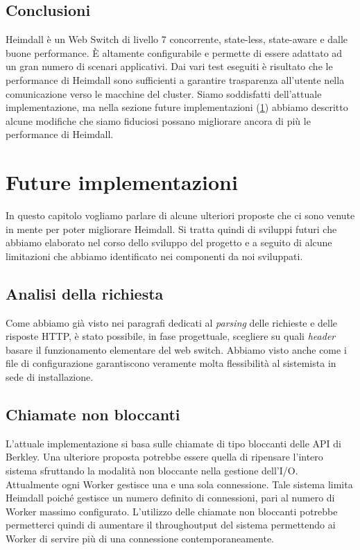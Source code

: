 \documentclass[italian]{tktltiki2}
\begin{document}
\subsection{Conclusioni}
Heimdall è un Web Switch di livello 7 concorrente, state-less, state-aware e dalle buone performance. È altamente configurabile e permette di essere adattato ad un gran numero di scenari applicativi. Dai vari test eseguiti è risultato che le performance di Heimdall sono sufficienti a garantire trasparenza all'utente nella comunicazione verso le macchine del cluster. Siamo soddisfatti dell'attuale implementazione, ma nella sezione future implementazioni (\ref{sec:future_decoded}) abbiamo descritto alcune modifiche che siamo fiduciosi possano migliorare ancora di più le performance di Heimdall.
\newpage
\section{Future implementazioni}
\label{sec:future_decoded}
In questo capitolo vogliamo parlare di alcune ulteriori proposte che ci sono venute in mente per poter migliorare Heimdall. Si tratta quindi di sviluppi futuri che abbiamo elaborato nel corso dello sviluppo del progetto e a seguito di alcune limitazioni che abbiamo identificato nei componenti da noi sviluppati.
\subsection{Analisi della richiesta}
Come abbiamo già visto nei paragrafi dedicati al \emph{parsing} delle richieste e delle risposte HTTP, è stato possibile, in fase progettuale, scegliere su quali \emph{header} basare il funzionamento elementare del web switch. Abbiamo visto anche come i file di configurazione garantiscono veramente molta flessibilità al sistemista in sede di installazione.

\subsection{Chiamate non bloccanti}
L'attuale implementazione si basa sulle chiamate di tipo bloccanti delle API di Berkley. Una ulteriore proposta potrebbe essere quella di ripensare l'intero sistema sfruttando la modalità non bloccante nella gestione dell'I/O.
\\
Attualmente ogni Worker gestisce una e una sola connessione. Tale sistema limita Heimdall poiché gestisce un numero definito di connessioni, pari al numero di Worker massimo configurato. L'utilizzo delle chiamate non bloccanti potrebbe permetterci quindi di aumentare il throughoutput del sistema permettendo ai Worker di servire più di una connessione contemporaneamente.
\end{document}
